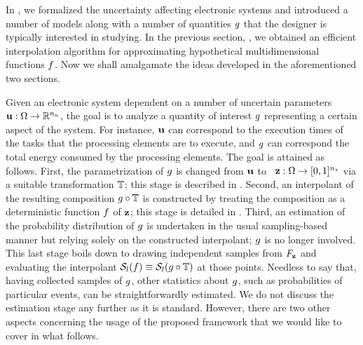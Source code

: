 In , we formalized the uncertainty affecting electronic systems
and introduced a number of models along with a number of quantities $g$ that
the designer is typically interested in studying. In the previous section,
, we obtained an efficient interpolation algorithm for
approximating hypothetical multidimensional functions $f$. Now we shall
amalgamate the ideas developed in the aforementioned two sections.

Given an electronic system dependent on a number of uncertain parameters $\mathbf{u}:
\Omega \to \mathbb{R}^{n_u}$, the goal is to analyze a quantity of interest $g$
representing a certain aspect of the system. For instance, $\mathbf{u}$ can correspond
to the execution times of the tasks that the processing elements are to execute,
and $g$ can correspond the total energy consumed by the processing elements.
The goal is attained as follows. First, the parametrization of $g$ is changed
from $\mathbf{u}$ to \rvs\ $\mathbf{z}: \Omega \to [0, 1]^{n_z}$ via a suitable
transformation $\mathbb{T}$; this stage is described in
. Second, an interpolant of the resulting composition
$g \circ \mathbb{T}$ is constructed by treating the composition as a
deterministic function $f$ of $\mathbf{z}$; this stage is detailed in
. Third, an estimation of the probability distribution of
$g$ is undertaken in the usual sampling-based manner but relying solely on the
constructed interpolant; $g$ is no longer involved. This last stage boils down
to drawing independent samples from $F_{\mathbf{z}}$ and evaluating the
interpolant $\mathcal{S}_{l}(f) \equiv \mathcal{S}_{l}(g \circ \mathbb{T})$ at
those points. Needless to say that, having collected samples of $g$, other
statistics about $g$, such as probabilities of particular events, can be
straightforwardly estimated. We do not discuss the estimation stage any further
as it is standard. However, there are two other aspects concerning the usage of
the proposed framework that we would like to cover in what follows.

